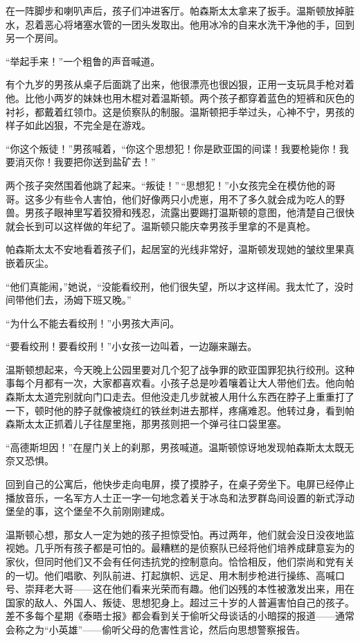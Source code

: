 在一阵脚步和喇叭声后，孩子们冲进客厅。帕森斯太太拿来了扳手。温斯顿放掉脏水，忍着恶心将堵塞水管的一团头发取出。他用冰冷的自来水洗干净他的手，回到另一个房间。

``举起手来！''一个粗鲁的声音喊道。

有个九岁的男孩从桌子后面跳了出来，他很漂亮也很凶狠，正用一支玩具手枪对着他。比他小两岁的妹妹也用木棍对着温斯顿。两个孩子都穿着蓝色的短裤和灰色的衬衫，都戴着红领巾。这是侦察队的制服。温斯顿把手举过头，心神不宁，男孩的样子如此凶狠，不完全是在游戏。

``你这个叛徒！''男孩喊着，``你这个思想犯！你是欧亚国的间谍！我要枪毙你！我要消灭你！我要把你送到盐矿去！''

两个孩子突然围着他跳了起来。``叛徒！''\,``思想犯！''小女孩完全在模仿他的哥哥。这多少有些令人害怕，他们好像两只小虎崽，用不了多久就会成为吃人的野兽。男孩子眼神里写着狡猾和残忍，流露出要踢打温斯顿的意图，他清楚自己很快就会长到可以这样做的年纪了。温斯顿只能庆幸男孩手里拿的不是真枪。

帕森斯太太不安地看着孩子们，起居室的光线非常好，温斯顿发现她的皱纹里果真嵌着灰尘。

``他们真能闹，''她说，``没能看绞刑，他们很失望，所以才这样闹。我太忙了，没时间带他们去，汤姆下班又晚。''

``为什么不能去看绞刑！''小男孩大声问。

``要看绞刑！要看绞刑！''小女孩一边叫着，一边蹦来蹦去。

温斯顿想起来，今天晚上公园里要对几个犯了战争罪的欧亚国罪犯执行绞刑。这种事每个月都有一次，大家都喜欢看。小孩子总是吵着嚷着让大人带他们去。他向帕森斯太太道完别就向门口走去。但他没走几步就被人用什么东西在脖子上重重打了一下，顿时他的脖子就像被烧红的铁丝刺进去那样，疼痛难忍。他转过身，看到帕森斯太太正抓着儿子往屋里拖，那男孩则把一个弹弓往口袋里塞。

``高德斯坦因！''在屋门关上的刹那，男孩喊道。温斯顿惊讶地发现帕森斯太太既无奈又恐惧。

回到自己的公寓后，他快步走向电屏，摸了摸脖子，在桌子旁坐下。电屏已经停止播放音乐，一名军方人士正一字一句地念着关于冰岛和法罗群岛间设置的新式浮动堡垒的事，这个堡垒不久前刚刚建成。

温斯顿心想，那女人一定为她的孩子担惊受怕。再过两年，他们就会没日没夜地监视她。几乎所有孩子都是可怕的。最糟糕的是侦察队已经将他们培养成肆意妄为的家伙，但同时他们又不会有任何违抗党的控制意向。恰恰相反，他们崇尚和党有关的一切。他们唱歌、列队前进、打起旗帜、远足、用木制步枪进行操练、高喊口号、崇拜老大哥------这在他们看来光荣而有趣。他们凶残的本性被激发出来，用在国家的敌人、外国人、叛徒、思想犯身上。超过三十岁的人普遍害怕自己的孩子。差不多每个星期《泰晤士报》都会看到关于偷听父母谈话的小暗探的报道------通常会称之为``小英雄''------偷听父母的危害性言论，然后向思想警察报告。

